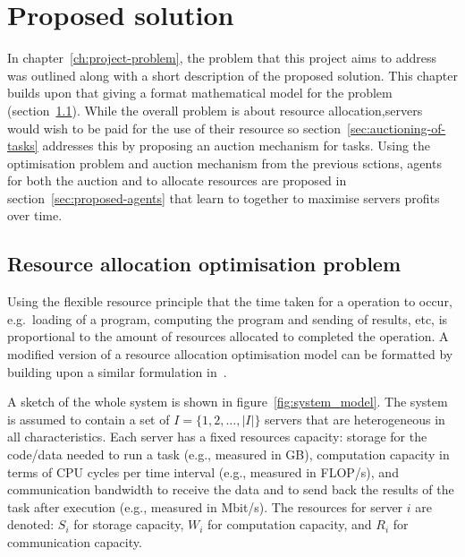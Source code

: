 \chapter{Proposed solution}\label{ch:proposed-solution}
In chapter~\ref{ch:project-problem}, the problem that this project aims to address was outlined along with a short
description of the proposed solution. This chapter builds upon that giving a format mathematical model for the problem
(section~\ref{sec:optimisation-problem}). While the overall problem is about resource allocation,servers
would wish to be paid for the use of their resource so section~\ref{sec:auctioning-of-tasks} addresses this by proposing
an auction mechanism for tasks. Using the optimisation problem and auction mechanism from the previous sctions,
agents for both the auction and to allocate resources are proposed in section~\ref{sec:proposed-agents} that learn to
together to maximise servers profits over time.

\section{Resource allocation optimisation problem}\label{sec:optimisation-problem}
Using the flexible resource principle that the time taken for a operation to
occur, e.g.\ loading of a program, computing the program and sending of results, etc, is proportional to the amount of
resources allocated to completed the operation. A modified version of a resource allocation optimisation model can be
formatted by building upon a similar formulation in~\cite{FlexibleResourceAllocation}.

A sketch of the whole system is shown in figure~\ref{fig:system_model}.
The system is assumed to contain a set of $I = \{1,2,\ldots,\left|I\right|\}$ servers that are heterogeneous in all
characteristics. Each server has a fixed resources capacity: storage for the code/data needed to run a task
(e.g., measured in GB), computation capacity in terms of CPU cycles per time interval (e.g., measured in FLOP/s),
and communication bandwidth to receive the data and to send back the results of the task after execution
(e.g., measured in Mbit/s). The resources for server $i$ are denoted: $S_i$ for storage capacity, $W_i$ for computation
capacity, and $R_i$ for communication capacity.

